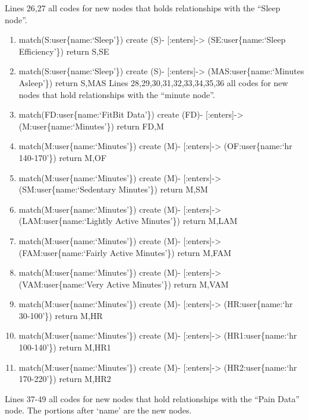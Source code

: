 \documentclass[]{book}
\providecommand{\tightlist}{%
  \setlength{\itemsep}{0pt}\setlength{\parskip}{0pt}}
\begin{document}
Lines 26,27 all codes for new nodes that holds relationships with the ``Sleep node''.

\begin{enumerate}
\def\labelenumi{\arabic{enumi}.}
\setcounter{enumi}{25}
\tightlist
\item
  match(S:user\{name:`Sleep'\}) create (S)- {[}:enters{]}-\textgreater{} (SE:user\{name:`Sleep Efficiency'\}) return S,SE
\item
  match(S:user\{name:`Sleep'\}) create (S)- {[}:enters{]}-\textgreater{} (MAS:user\{name:`Minutes Asleep'\}) return S,MAS
  Lines 28,29,30,31,32,33,34,35,36 all codes for new nodes that hold relationships with the ``minute node''.
\item
  match(FD:user\{name:`FitBit Data'\}) create (FD)- {[}:enters{]}-\textgreater{} (M:user\{name:`Minutes'\}) return FD,M
\item
  match(M:user\{name:`Minutes'\}) create (M)- {[}:enters{]}-\textgreater{} (OF:user\{name:`hr 140-170'\}) return M,OF
\item
  match(M:user\{name:`Minutes'\}) create (M)- {[}:enters{]}-\textgreater{} (SM:user\{name:`Sedentary Minutes'\}) return M,SM
\item
  match(M:user\{name:`Minutes'\}) create (M)- {[}:enters{]}-\textgreater{} (LAM:user\{name:`Lightly Active Minutes'\}) return M,LAM
\item
  match(M:user\{name:`Minutes'\}) create (M)- {[}:enters{]}-\textgreater{} (FAM:user\{name:`Fairly Active Minutes'\}) return M,FAM
\item
  match(M:user\{name:`Minutes'\}) create (M)- {[}:enters{]}-\textgreater{} (VAM:user\{name:`Very Active Minutes'\}) return M,VAM
\item
  match(M:user\{name:`Minutes'\}) create (M)- {[}:enters{]}-\textgreater{} (HR:user\{name:`hr 30-100'\}) return M,HR
\item
  match(M:user\{name:`Minutes'\}) create (M)- {[}:enters{]}-\textgreater{} (HR1:user\{name:`hr 100-140'\}) return M,HR1
\item
  match(M:user\{name:`Minutes'\}) create (M)- {[}:enters{]}-\textgreater{} (HR2:user\{name:`hr 170-220'\}) return M,HR2
\end{enumerate}

Lines 37-49 all codes for new nodes that hold relationships with the ``Pain Data'' node. The portions after `name' are the new nodes.
\end{document}

